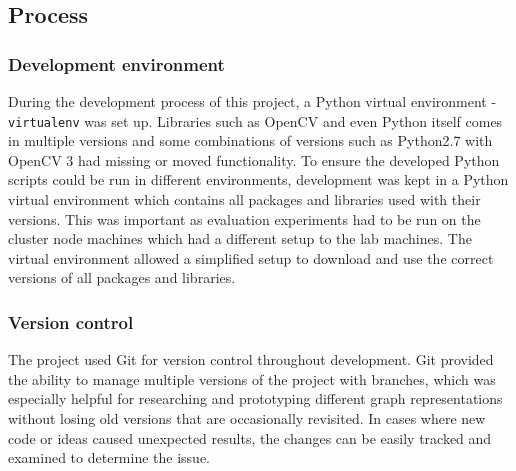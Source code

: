 \subsection{Process}

\subsubsection{Development environment}
During the development process of this project, a Python virtual environment - \texttt{virtualenv} was set up. Libraries such as OpenCV and even Python itself comes in multiple versions and some combinations of versions such as Python2.7 with OpenCV 3 had missing or moved functionality. To ensure the developed Python scripts could be run in different environments, development was kept in a Python virtual environment which contains all packages and libraries used with their versions. This was important as evaluation experiments had to be run on the cluster node machines which had a different setup to the lab machines. The virtual environment allowed a simplified setup to download and use the correct versions of all packages and libraries.

\subsubsection{Version control}
The project used Git for version control throughout development. Git provided the ability to manage multiple versions of the project with branches, which was especially helpful for researching and prototyping different graph representations without losing old versions that are occasionally revisited. In cases where new code or ideas caused unexpected results, the changes can be easily tracked and examined to determine the issue.

